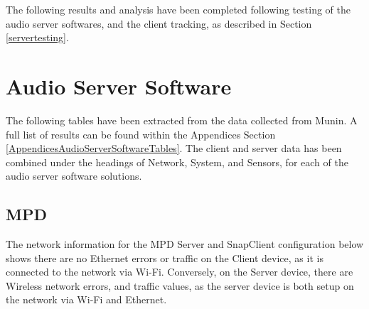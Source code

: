 \documentclass[11pt,a4paper,headinclude=false,footinclude=false]{scrreprt}
\begin{document}
The following results and analysis have been completed following testing
of the audio server softwares, and the client tracking, as described in
Section \ref{servertesting}.

\section{\texorpdfstring{Audio Server Software
\label{AudioServerSoftwareResults}}{Audio Server Software }}\label{audio-server-software}

The following tables have been extracted from the data collected from
Munin. A full list of results can be found within the Appendices Section
\ref{AppendicesAudioServerSoftwareTables}. The client and server data
has been combined under the headings of Network, System, and Sensors,
for each of the audio server software solutions.

\subsection{MPD}\label{mpd-1}

The network information for the MPD Server and SnapClient configuration
below shows there are no Ethernet errors or traffic on the Client
device, as it is connected to the network via Wi-Fi. Conversely, on the
Server device, there are Wireless network errors, and traffic values, as
the server device is both setup on the network via Wi-Fi and Ethernet.
\end{document}
